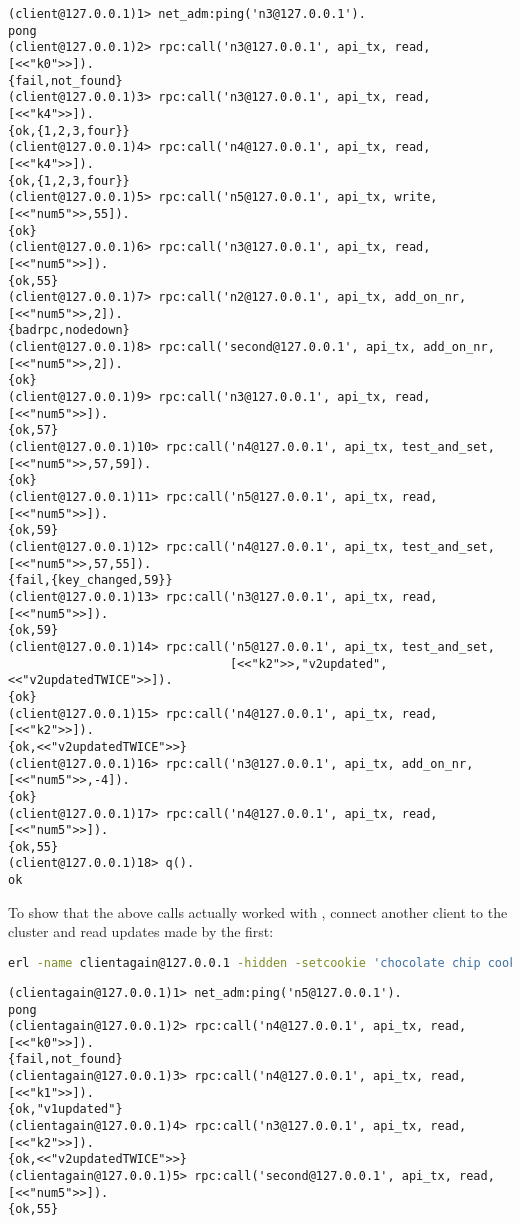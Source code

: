 \begin{lstlisting}
(client@127.0.0.1)1> net_adm:ping('n3@127.0.0.1').
pong
(client@127.0.0.1)2> rpc:call('n3@127.0.0.1', api_tx, read, [<<"k0">>]).
{fail,not_found}
(client@127.0.0.1)3> rpc:call('n3@127.0.0.1', api_tx, read, [<<"k4">>]).
{ok,{1,2,3,four}}
(client@127.0.0.1)4> rpc:call('n4@127.0.0.1', api_tx, read, [<<"k4">>]).
{ok,{1,2,3,four}}
(client@127.0.0.1)5> rpc:call('n5@127.0.0.1', api_tx, write, [<<"num5">>,55]).
{ok}
(client@127.0.0.1)6> rpc:call('n3@127.0.0.1', api_tx, read, [<<"num5">>]).
{ok,55}
(client@127.0.0.1)7> rpc:call('n2@127.0.0.1', api_tx, add_on_nr, [<<"num5">>,2]).
{badrpc,nodedown}
(client@127.0.0.1)8> rpc:call('second@127.0.0.1', api_tx, add_on_nr, [<<"num5">>,2]).
{ok}
(client@127.0.0.1)9> rpc:call('n3@127.0.0.1', api_tx, read, [<<"num5">>]).
{ok,57}
(client@127.0.0.1)10> rpc:call('n4@127.0.0.1', api_tx, test_and_set, [<<"num5">>,57,59]).
{ok}
(client@127.0.0.1)11> rpc:call('n5@127.0.0.1', api_tx, read, [<<"num5">>]).
{ok,59}
(client@127.0.0.1)12> rpc:call('n4@127.0.0.1', api_tx, test_and_set, [<<"num5">>,57,55]).
{fail,{key_changed,59}}
(client@127.0.0.1)13> rpc:call('n3@127.0.0.1', api_tx, read, [<<"num5">>]).
{ok,59}
(client@127.0.0.1)14> rpc:call('n5@127.0.0.1', api_tx, test_and_set,
                               [<<"k2">>,"v2updated",<<"v2updatedTWICE">>]).
{ok}
(client@127.0.0.1)15> rpc:call('n4@127.0.0.1', api_tx, read, [<<"k2">>]).
{ok,<<"v2updatedTWICE">>}
(client@127.0.0.1)16> rpc:call('n3@127.0.0.1', api_tx, add_on_nr, [<<"num5">>,-4]).
{ok}
(client@127.0.0.1)17> rpc:call('n4@127.0.0.1', api_tx, read, [<<"num5">>]).
{ok,55}
(client@127.0.0.1)18> q().
ok
\end{lstlisting}

To show that the above calls actually worked with \scalaris{}, connect
another client to the cluster and read updates made by the first:

\begin{lstlisting}[language=sh]
erl -name clientagain@127.0.0.1 -hidden -setcookie 'chocolate chip cookie'
\end{lstlisting}

\begin{lstlisting}
(clientagain@127.0.0.1)1> net_adm:ping('n5@127.0.0.1').
pong
(clientagain@127.0.0.1)2> rpc:call('n4@127.0.0.1', api_tx, read, [<<"k0">>]).
{fail,not_found}
(clientagain@127.0.0.1)3> rpc:call('n4@127.0.0.1', api_tx, read, [<<"k1">>]).
{ok,"v1updated"}
(clientagain@127.0.0.1)4> rpc:call('n3@127.0.0.1', api_tx, read, [<<"k2">>]).
{ok,<<"v2updatedTWICE">>}
(clientagain@127.0.0.1)5> rpc:call('second@127.0.0.1', api_tx, read, [<<"num5">>]).
{ok,55}
\end{lstlisting}

